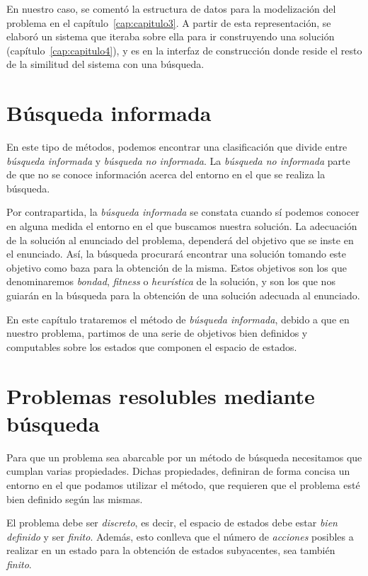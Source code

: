 En nuestro caso, se comentó la estructura de datos para la modelización del problema en el capítulo~\ref{cap:capitulo3}. A partir de esta representación, se elaboró un sistema que iteraba sobre ella para ir construyendo una solución (capítulo~\ref{cap:capitulo4}), y es en la interfaz de construcción donde reside el resto de la similitud del sistema con una búsqueda.

\section{Búsqueda informada}

En este tipo de métodos, podemos encontrar una clasificación que divide entre \emph{búsqueda informada} y \emph{búsqueda no informada}. La \emph{búsqueda no informada} parte de que no se conoce información acerca del entorno en el que se realiza la búsqueda.

Por contrapartida, la \emph{búsqueda informada} se constata cuando sí podemos conocer en alguna medida el entorno en el que buscamos nuestra solución. La adecuación de la solución al enunciado del problema, dependerá del objetivo que se inste en el enunciado. Así, la búsqueda procurará encontrar una solución tomando este objetivo como baza para la obtención de la misma. Estos objetivos son los que denominaremos \emph{bondad}, \emph{fitness} o \emph{heurística} de la solución, y son los que nos guiarán en la búsqueda para la obtención de una solución adecuada al enunciado.

En este capítulo trataremos el método de \emph{búsqueda informada}, debido a que en nuestro problema, partimos de una serie de objetivos bien definidos y computables sobre los estados que componen el espacio de estados.

\section{Problemas resolubles mediante búsqueda}

Para que un problema sea abarcable por un método de búsqueda necesitamos que cumplan varias propiedades. Dichas propiedades, definiran de forma concisa un entorno en el que podamos utilizar el método, que requieren que el problema esté bien definido según las mismas.

El problema debe ser \emph{discreto}, es decir, el espacio de estados debe estar \emph{bien definido} y ser \emph{finito}. Además, esto conlleva que el número de \emph{acciones} posibles a realizar en un estado para la obtención de estados subyacentes, sea también \emph{finito}.

